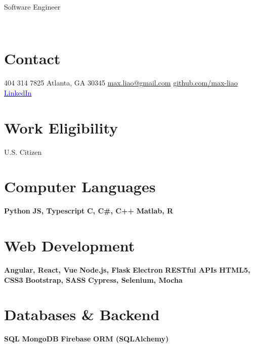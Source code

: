 \documentclass[]{cv}
\begin{document}
{Software Engineer}
\par

\begin{aside} \footnotesize%
	~
	~
	~
	~
	~
	~
	~
	~
	\section{Contact \vspace{0.1cm}}
	{\small 404 314 7825 \vspace{0.05cm}}
	{\small Atlanta, GA 30345 \vspace{0.1cm}}
    {\small \href{mailto:max.liao@gmail.com}{max.liao@gmail.com} \vspace{0.05cm}}
    {\small \href{http://github.com/max-liao}{github.com/max-liao} \vspace{0.05cm}}
    {\small \href{http://www.linkedin.com/in/liao-max}{\textcolor{blue}{LinkedIn}}}%

	\section{\small Work Eligibility \vspace{0.1cm}}
	U.S. Citizen
	\section{\small Computer Languages \vspace{0.05cm}}
		\textbf{Python}
		\textbf{JS, Typescript}
		\textbf{C, C\#, C++}
		\textbf{Matlab, R}
	\section{\small Web Development \vspace{0.05cm}}
		\textbf{Angular, React, Vue}
        \textbf{Node.js, Flask}
		\textbf{Electron}
		\textbf{RESTful APIs}
        \textbf{HTML5, CSS3}
		\textbf{Bootstrap, SASS}
		\textbf{Cypress, Selenium, Mocha}
	\section{\small Databases \& Backend \vspace{0.05cm}}
		\textbf{SQL}
        \textbf{MongoDB}
		\textbf{Firebase}
        \textbf{ORM (SQLAlchemy)}

\end{aside}
\end{document}

